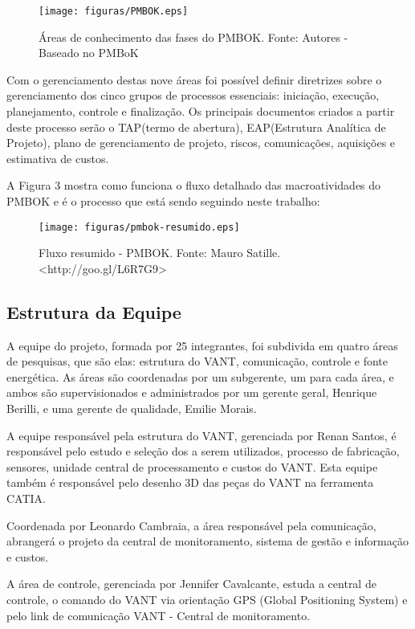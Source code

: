  \begin{figure}[ht]
	\centering
		\texttt{[image: figuras/PMBOK.eps]}
	\caption{Áreas de conhecimento das fases do PMBOK. Fonte: Autores - Baseado no PMBoK}
\end{figure}

Com o gerenciamento destas nove áreas foi possível definir diretrizes sobre o gerenciamento dos cinco grupos de processos essenciais: iniciação, execução, planejamento, controle e finalização. Os principais documentos criados a partir deste processo serão o TAP(termo de abertura), EAP(Estrutura Analítica de Projeto), plano de gerenciamento de projeto, riscos, comunicações, aquisições e estimativa de custos.

A Figura 3 mostra como funciona o fluxo detalhado das macroatividades do PMBOK e é o processo que está sendo seguindo neste trabalho:

\begin{figure}[ht]
	\centering
		\texttt{[image: figuras/pmbok-resumido.eps]}
	\caption{Fluxo resumido - PMBOK. Fonte: Mauro Satille. <http://goo.gl/L6R7G9>}
\end{figure}

\subsection{Estrutura da Equipe}
A equipe do projeto, formada por 25 integrantes, foi subdivida em quatro áreas de pesquisas, que são elas: estrutura do VANT, comunicação, controle e fonte energética. As áreas são coordenadas por um subgerente, um para cada área, e ambos são supervisionados e administrados por um gerente geral, Henrique Berilli, e uma gerente de qualidade, Emilie Morais.

A equipe responsável pela estrutura do VANT, gerenciada por Renan Santos, é responsável pelo estudo e seleção dos a serem utilizados, processo de fabricação, sensores, unidade central de processamento e custos do VANT. Esta equipe também é responsável pelo desenho 3D das peças do VANT na ferramenta CATIA.  
	
Coordenada por Leonardo Cambraia, a área responsável pela comunicação, abrangerá o projeto da central de monitoramento, sistema de gestão e informação e custos.
	
A área de controle, gerenciada por Jennifer Cavalcante, estuda a central de controle, o comando do VANT via orientação GPS (Global Positioning System) e pelo link de comunicação VANT - Central de monitoramento.
	

